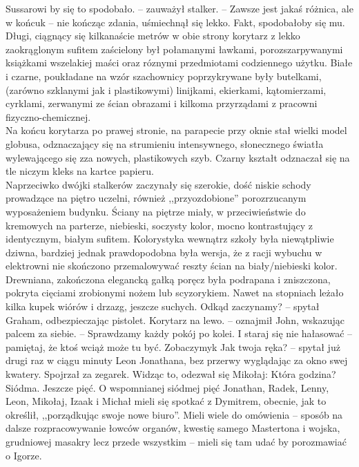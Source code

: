 \documentclass[../MAIN.tex]{subfiles}
\begin{document}
\xx Sussarowi by się to spodobało. -- zauważył stalker. -- Zawsze jest jakaś różnica, ale w końcu\3k -- nie kończąc zdania, uśmiechnął się lekko.
\xx Fakt, spodobałoby się mu.
\qd
Długi, ciągnący się kilkanaście metrów w obie strony korytarz z lekko zaokrąglonym sufitem zaścielony był połamanymi ławkami, porozszarpywanymi książkami wszelakiej maści oraz róznymi przedmiotami codziennego użytku. Białe i czarne, poukładane na wzór szachownicy poprzykrywane były butelkami, (zarówno szklanymi jak i plastikowymi) linijkami, ekierkami, kątomierzami, cyrklami, zerwanymi ze ścian obrazami i kilkoma przyrządami z pracowni fizyczno-chemicznej.\\
Na końcu korytarza po prawej stronie, na parapecie przy oknie stał wielki model globusa, odznaczający się na strumieniu intensywnego, słonecznego światła wylewającego się zza nowych, plastikowych szyb. Czarny kształt odznaczał się na tle niczym kleks na kartce papieru.\\
Naprzeciwko dwójki stalkerów zaczynały się szerokie, dość niskie schody prowadzące na piętro uczelni, również ,,przyozdobione'' porozrzucanym wyposażeniem budynku. Ściany na piętrze miały, w przeciwieństwie do kremowych na parterze, niebieski, soczysty kolor, mocno kontrastujący z identycznym, białym sufitem. Kolorystyka wewnątrz szkoły była niewątpliwie dziwna, bardziej jednak prawdopodobna była wersja, że z racji wybuchu w elektrowni nie skończono przemalowywać reszty ścian na biały/niebieski kolor.\\
Drewniana, zakończona elegancką gałką poręcz była podrapana i zniszczona, pokryta cięciami zrobionymi nożem lub scyzorykiem. Nawet na stopniach leżało kilka kupek wiórów i drzazg, jeszcze suchych.
\sx Odkąd zaczynamy? -- spytał Graham, odbezpieczając pistolet.
\xx Korytarz na lewo. -- oznajmił John, wskazując palcem za siebie. -- Sprawdzamy każdy pokój po kolei. I staraj się nie hałasować -- pamiętaj, że ktoś wciąż może tu być.
\xx Zobaczymy\3k
\dd
\xx Jak twoja ręka? -- spytał już drugi raz w ciągu minuty Leon Jonathana, bez przerwy wyglądając za okno swej kwatery. Spojrzał za zegarek. Widząc to, odezwał się Mikołaj:
\xx Która godzina?
\xx Siódma. Jeszcze pięć.
\qd
O wspomnianej siódmej pięć Jonathan, Radek, Lenny, Leon, Mikołaj, Izaak i Michał mieli się spotkać z Dymitrem, obecnie, jak to określił, ,,porządkując swoje nowe biuro''. Mieli wiele do omówienia -- sposób na dalsze rozpracowywanie łowców organów, kwestię samego Mastertona i wojska, grudniowej masakry lecz przede wszystkim -- mieli się tam udać by porozmawiać o Igorze.\\
\end{document}
